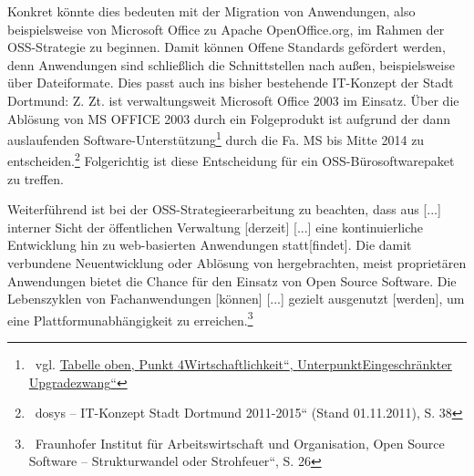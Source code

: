 \documentclass[a4paper]{article}
\newcommand\textstyleInternetlink[1]{\foreignlanguage{english}{\textcolor[rgb]{0.0,0.0,0.5019608}{#1}}}
\begin{document}
{
Konkret k\"onnte dies bedeuten mit der Migration von Anwendungen, also
beispielsweise von Microsoft Office zu Apache OpenOffice.org, im Rahmen
der OSS-Strategie zu beginnen. Damit k\"onnen Offene Standards
gef\"ordert werden, denn Anwendungen sind schlie{\ss}lich die
Schnittstellen nach au{\ss}en, beispielsweise \"uber Dateiformate. Dies
passt auch ins bisher bestehende IT-Konzept der Stadt Dortmund:
{\guillemotright}Z. Zt. ist verwaltungsweit Microsoft Office 2003 im
Einsatz. \"Uber die Abl\"osung von MS OFFICE 2003 durch ein
Folgeprodukt ist aufgrund der dann auslaufenden
Software-Unterst\"utzung\footnote{\ vgl.
\hyperlink{EingeschrnkterUpgradezwang}{\textstyleInternetlink{Tabelle}}\hyperlink{EingeschrnkterUpgradezwang}{\textstyleInternetlink{
}}\hyperlink{EingeschrnkterUpgradezwang}{\textstyleInternetlink{oben,}}\hyperlink{EingeschrnkterUpgradezwang}{\textstyleInternetlink{
}}\hyperlink{EingeschrnkterUpgradezwang}{\textstyleInternetlink{Punkt}}\hyperlink{EingeschrnkterUpgradezwang}{\textstyleInternetlink{
}}\hyperlink{EingeschrnkterUpgradezwang}{\textstyleInternetlink{4}}\hyperlink{EingeschrnkterUpgradezwang}{\textstyleInternetlink{
{\quotedblbase}}}\hyperlink{EingeschrnkterUpgradezwang}{\textstyleInternetlink{Wirtschaftlichkeit}}\hyperlink{EingeschrnkterUpgradezwang}{\textstyleInternetlink{{\textquotedblleft}}}\hyperlink{EingeschrnkterUpgradezwang}{\textstyleInternetlink{,}}\hyperlink{EingeschrnkterUpgradezwang}{\textstyleInternetlink{
}}\hyperlink{EingeschrnkterUpgradezwang}{\textstyleInternetlink{Unterpunkt}}\hyperlink{EingeschrnkterUpgradezwang}{\textstyleInternetlink{
{\quotedblbase}}}\hyperlink{EingeschrnkterUpgradezwang}{\textstyleInternetlink{Eingeschr\"ankter}}\hyperlink{EingeschrnkterUpgradezwang}{\textstyleInternetlink{
}}\hyperlink{EingeschrnkterUpgradezwang}{\textstyleInternetlink{Upgradezwang}}\hyperlink{EingeschrnkterUpgradezwang}{\textstyleInternetlink{{\textquotedblleft}}}}
durch die Fa. MS bis Mitte 2014 zu
entscheiden.{\guillemotleft}\footnote{\ dosys --
{\quotedblbase}IT-Konzept Stadt Dortmund 2011-2015{\textquotedblleft}
(Stand 01.11.2011), S. 38} Folgerichtig ist diese Entscheidung f\"ur
ein OSS-B\"urosoftwarepaket zu treffen.}


\bigskip

{
Weiterf\"uhrend ist bei der OSS-Strategieerarbeitung zu beachten, dass
aus {\guillemotright} [...] interner Sicht der \"offentlichen
Verwaltung [derzeit] [...] eine kontinuierliche Entwicklung hin zu
web-basierten Anwendungen statt[findet]. Die damit verbundene
Neuentwicklung oder Abl\"osung von hergebrachten, meist propriet\"aren
Anwendungen bietet die Chance f\"ur den Einsatz von Open Source
Software. Die Lebenszyklen von Fachanwendungen [k\"onnen] [...] gezielt
ausgenutzt [werden], um eine Plattformunabh\"angigkeit zu
erreichen.{\guillemotleft}\footnote{\ Fraunhofer Institut f\"ur
Arbeitswirtschaft und Organisation, {\quotedblbase}Open Source Software
-- Strukturwandel oder Strohfeuer{\textquotedblleft}, S. 26}}
\end{document}
